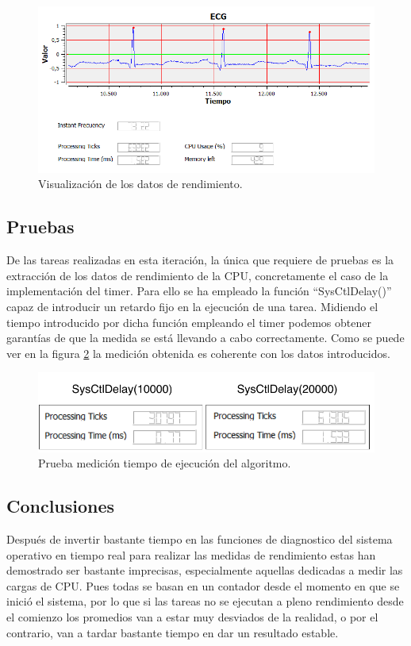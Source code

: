         \begin{figure}[H]
                \centering
                        \includegraphics[width = 0.9 \linewidth]{figuras/Performance.PNG}
                \caption{Visualización de los datos de rendimiento.}
                \label{fig:performance}
        \end{figure}
        
    \subsection{Pruebas}
        
        De las tareas realizadas en esta iteración, la única que requiere de pruebas es la extracción de los datos de rendimiento de la CPU, concretamente el caso de la implementación del timer. Para ello se ha empleado la función ``SysCtlDelay()'' capaz de introducir un retardo fijo en la ejecución de una tarea. Midiendo el tiempo introducido por dicha función empleando el timer podemos obtener garantías de que la medida se está llevando a cabo correctamente. Como se puede ver en la figura \ref{fig:performanceTest} la medición obtenida es coherente con los datos introducidos.
        
        \begin{figure}[H]
                \centering
                        \includegraphics[width = 0.9 \linewidth]{figuras/PerformanceTest.pdf}
                \caption{Prueba medición tiempo de ejecución del algoritmo.}
                \label{fig:performanceTest}
        \end{figure}

    \subsection{Conclusiones}
    
        Después de invertir bastante tiempo en las funciones de diagnostico del sistema operativo en tiempo real para realizar las medidas de rendimiento estas han demostrado ser bastante imprecisas, especialmente aquellas dedicadas a medir las cargas de CPU. Pues todas se basan en un contador desde el momento en que se inició el sistema, por lo que si las tareas no se ejecutan a pleno rendimiento desde el comienzo los promedios van a estar muy desviados de la realidad, o por el contrario, van a tardar bastante tiempo en dar un resultado estable.